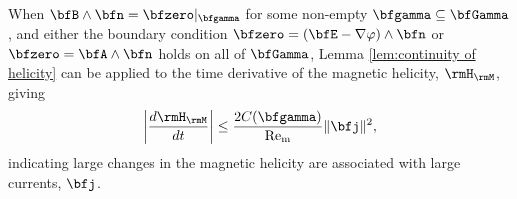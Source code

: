     \begin{corollary}
        When $\bfB\wedge\bfn  =  \bfzero|_{\bfgamma}$ for some non-empty $\bfgamma  \subseteq  \bfGamma$, and either the boundary condition $\bfzero  =  (\bfE - \nabla\varphi)\wedge\bfn$ or $\bfzero  =  \bfA\wedge\bfn$ holds on all of $\bfGamma$, Lemma \ref{lem:continuity of helicity} can be applied to the time derivative of the magnetic helicity, $\rmH_{\rmM}$, giving
        \begin{equation}
            \left|\frac{d\rmH_{\rmM}}{dt}\right|  \leq  \frac{2C(\bfgamma)}{\rmRem}\|\bfj\|^{2},
        \end{equation}
        indicating large changes in the magnetic helicity are associated with large currents, $\bfj$.
    \end{corollary}


    \line